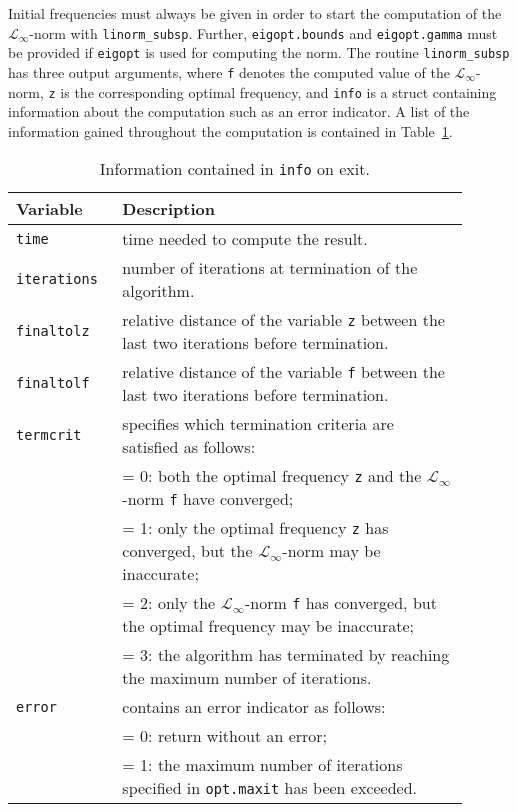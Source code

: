 \documentclass[10pt,a4paper]{article}
\begin{document}
Initial frequencies must always be given in order to start the computation of the $\mathcal{L}_\infty$-norm with \texttt{linorm\_subsp}. Further, \texttt{eigopt.bounds} and \texttt{eigopt.gamma} must be provided if \texttt{eigopt} is used for computing the norm.
The routine \texttt{linorm\_subsp} has three output arguments, where \texttt{f} denotes the computed value of the $\mathcal{L}_\infty$-norm, \texttt{z} is the corresponding optimal frequency, and \texttt{info} is a struct containing information about the computation such as an error indicator. A list of the information gained throughout the computation is contained in Table~\ref{tab:info}. 
\begin{longtable}{p{0.2\linewidth}p{0.7\linewidth}}
\caption{Information contained in \texttt{info} on exit.} \\
\label{tab:info}
\centering
\textbf{Variable}      & \textbf{Description} \\ \hline
\texttt{time}          & time needed to compute the result. \\ \hline
\texttt{iterations}    & number of iterations at termination of the
                         algorithm. \\ \hline 
\texttt{finaltolz}     & relative distance of the variable \texttt{z} between
                         the last two iterations before termination. \\ \hline
\texttt{finaltolf}     & relative distance of the variable \texttt{f} between
                         the last two iterations before termination. \\ \hline
\texttt{termcrit}      & specifies which termination criteria are
                         satisfied as follows: \\
                       & = 0: both the optimal frequency \texttt{z} and the 
                              $\mathcal{L}_\infty$-norm \texttt{f} have converged; \\
                       & = 1: only the optimal frequency \texttt{z} has
                              converged, but the $\mathcal{L}_\infty$-norm may be
                              inaccurate; \\
                       & = 2: only the $\mathcal{L}_\infty$-norm \texttt{f} has converged,
                              but the optimal frequency may be
                              inaccurate; \\
                       & = 3: the algorithm has terminated by reaching
                              the maximum number of iterations. \\ \hline
\texttt{error}         & contains an error indicator as follows: \\
                       & = 0: return without an error; \\
                       & = 1: the maximum number of iterations  
                              specified in \texttt{opt.maxit} has been exceeded. \\ \hline
\end{longtable}
\end{document}
